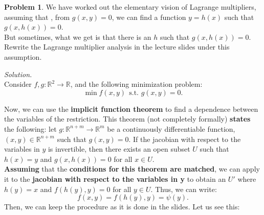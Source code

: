 \documentclass[a4paper]{article}
\newenvironment{problem}[2][Problem]
    { \begin{mdframed}[backgroundcolor=gray!20] \vspace*{0.1cm} \textbf{#1 #2}.}
    {  \end{mdframed}\vspace{0.3cm}}
\newenvironment{solution}
    {\textit{Solution.}\\}
    {}
\newcommand{\R}{\mathbb R}
\begin{document}
\begin{problem}{1}
We have worked out the elementary vision of Lagrange multipliers, assuming that , from \(g(x,y) = 0\), we can find a function \(y = h(x)\) such that \(g(x,h(x)) = 0\).\\

But sometimes, what we get is that there is an \(h\) such that \(g(x,h(x)) = 0\). Rewrite the Lagrange multiplier analysis in the lecture slides under this assumption.
\end{problem}
\begin{solution}
Consider \(f,g:\R^2 \to \R\), and the following minimization problem:
\begin{equation}\label{p1:problem}
\min f(x,y) \ \ \text{s.t.  } g(x,y) = 0. 
\end{equation}

Now, we can use the \textbf{implicit function theorem} to find a dependence between the variables of the restriction. This theorem (not completely formally) \textbf{states} the following: let \(g:\R^{n+m} \to \R^m\) be a continuously differentiable function, \((x,y) \in \R^{n+m}\) such that \(g(x,y) = 0\). If the jacobian with respect to the variables in \(y\) is invertible, then there exists an open subset \(U\) such that \(h(x) = y\) and \(g(x,h(x)) = 0\) for all \(x \in U\). \\

\textbf{Assuming} that the \textbf{conditions for this theorem are matched}, we can apply it to the \textbf{jacobian with respect to the variables in y} to obtain an \(U'\) where \(h(y) = x\) and \(f(h(y),y) = 0\) for all \(y \in U\). Thus, we can write:
\[
f(x,y) = f(h(y),y) =  \psi(y).
\]
Then, we can keep the procedure as it is done in the slides. Let us see this:\\


\end{solution}
\end{document}

